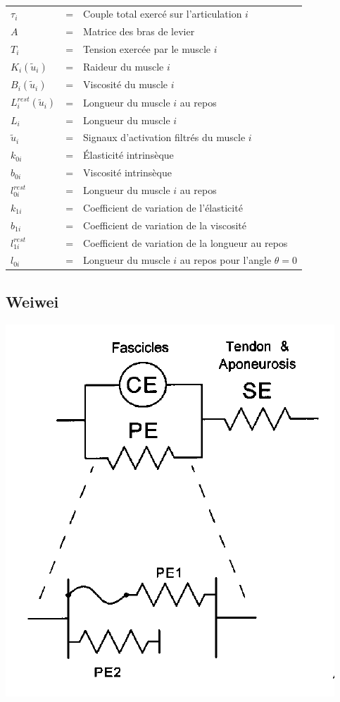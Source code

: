 \documentclass[pdftex,a4paper,11pt]{article}
\begin{document}
\paragraph{}
\begin{tabular}{lcl}
    $\tau_i$ & = & Couple total exercé sur l'articulation $i$ \\
    $A$  & = & Matrice des bras de levier \\
    $T_i$  & = & Tension exercée par le muscle $i$ \\
    $K_i(\tilde{u}_i)$ & = & Raideur du muscle $i$ \\
    $B_i(\tilde{u}_i)$ & = & Viscosité du muscle $i$ \\
    $L_i^{rest}(\tilde{u}_i)$ & = & Longueur du muscle $i$ au repos \\
    $L_i$ & = & Longueur du muscle $i$ \\
    $\tilde{u}_i$ & = & Signaux d'activation filtrés du muscle $i$ \\
    $k_{0i}$ & = & Élasticité intrinsèque \\
    $b_{0i}$ & = & Viscosité intrinsèque \\
    $l^{rest}_{0i}$ & = & Longueur du muscle $i$ au repos \\
    $k_{1i}$ & = & Coefficient de variation de l'élasticité \\
    $b_{1i}$ & = & Coefficient de variation de la viscosité \\
    $l^{rest}_{1i}$ & = & Coefficient de variation de la longueur au repos \\
    $l_{0i}$ & = & Longueur du muscle $i$ au repos pour l'angle $\theta = 0$ \\
\end{tabular}

\subsection{Weiwei}

\begin{center}
        \includegraphics[width=.40\linewidth]{fig/brown}
\end{center}
\end{document}
